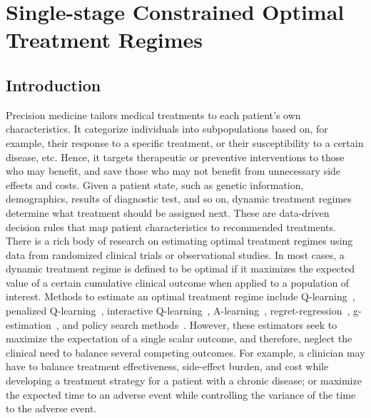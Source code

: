 \chapter{Single-stage Constrained Optimal Treatment Regimes}
\label{chap-one}
\section{Introduction}
Precision medicine tailors medical treatments to each patient's own characteristics. It categorize individuals into subpopulations based on, for example, their response to a specific treatment, or their susceptibility to a certain disease, etc. Hence, it targets therapeutic or preventive interventions to those who may benefit, and save those who may not benefit from unnecessary side effects and costs. Given a patient state, such as genetic information, demographics, results of diagnostic test, and so on, dynamic treatment regimes determine what treatment should be assigned next. These are data-driven decision rules that map patient characteristics to recommended treatments. \\

There is a rich body of research on estimating optimal treatment regimes using data from randomized clinical trials or observational studies. In most cases, a dynamic treatment regime is defined to be optimal if it maximizes the expected value of a certain cumulative clinical outcome when applied to a population of interest. Methods to estimate an optimal treatment regime include Q-learning~\cite{Nahum2012}, penalized Q-learning~\cite{Song2011}, interactive Q-learning~\cite{Linn2014}, A-learning~\cite{Schulte2014}, regret-regression~\cite{henderson2010}, g-estimation~\cite{gestimation}, and policy search methods~\cite{Zhao2012,Zhao2015,Zhang2012,Zhang2012b,Orellana2010a,Zhao2012}. However, these estimators seek to maximize the expectation of a single scalar outcome, and therefore, neglect the clinical need to balance several competing outcomes. For example, a clinician may have to balance treatment effectiveness, side-effect burden, and cost while developing a treatment strategy for a patient with a chronic disease; or maximize the expected time to an adverse event while controlling the variance of the time to the adverse event.\\

